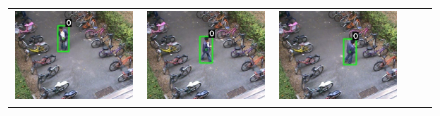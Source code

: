 \begin{figure}[t]
  \centering
  \begin{tabular}{ccccc}
    \includegraphics[scale=0.21]{figures/case-1-suspicious-0187} &
    \includegraphics[scale=0.21]{figures/case-1-suspicious-0208} &
    \includegraphics[scale=0.21]{figures/case-1-suspicious-0225} &

\end{tabular}
\end{figure}
